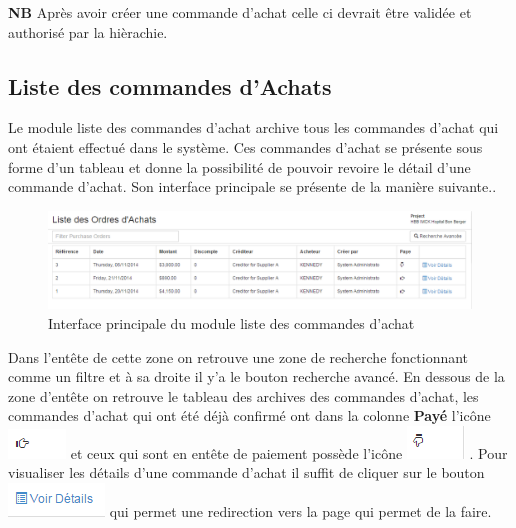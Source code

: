\documentclass[12pt,a4paper]{report}
\begin{document}
\textbf{NB} Après avoir créer une commande d'achat celle ci devrait être validée et authorisé par la hièrachie.
\newpage
\subsection{Liste des commandes d'Achats}
Le module liste des commandes d'achat archive tous les commandes d'achat qui ont étaient effectué dans le système. Ces commandes d'achat se présente sous forme d'un tableau et donne la possibilité de pouvoir revoire le détail d'une commande d'achat. Son interface principale se présente de la manière suivante..

\begin{figure}[h]
\begin{center}
\includegraphics[width=12cm]{pic/ListeOrdreAchat.png}
\end{center}
\caption{Interface principale du module liste des commandes d'achat}
\label{Interface principale du module liste des commandes d'achat}
\end{figure} 

Dans l'entête de cette zone on retrouve une zone de recherche fonctionnant comme un filtre et à sa droite il y'a le bouton recherche avancé.
En dessous de la zone d'entête on retrouve le tableau des archives des commandes d'achat, les commandes d'achat qui ont été déjà confirmé ont dans la colonne \textbf{Payé} l'icône \includegraphics[scale=0.7]{pic/OkCOnfPOrd.png} et ceux qui sont en entête de paiement possède l'icône \includegraphics[scale=0.7]{pic/OrConKO.png} . Pour visualiser les détails d'une commande d'achat il suffit de cliquer sur le bouton \includegraphics[scale=0.7]{pic/VoirDetail.png} qui permet une redirection vers la page qui permet de la faire. 
\end{document}
